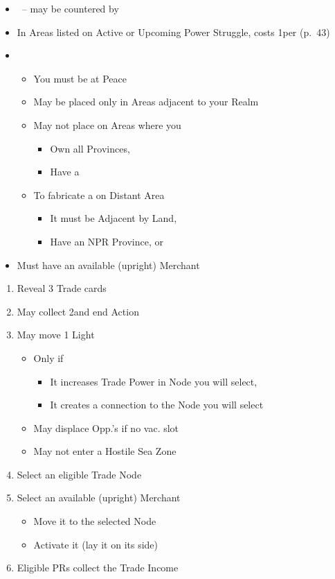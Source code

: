 \documentclass[10pt]{article}
\begin{document}
\begin{itemize}
	\item \covertaction~-- may be countered by 
	\item In Areas listed on Active or Upcoming Power Struggle, costs 1\diplopower per \claim (p.~43)
	\item {}
	\begin{itemize}
		\item You must be at Peace
		\item May be placed only in Areas adjacent to your Realm
		\item May not place \claim on Areas where you
		\begin{itemize}
			\item Own all Provinces,  
			\item Have a \claim
		\end{itemize}
		\item To fabricate a \claim on Distant Area
		\begin{itemize}
			\item It must be Adjacent by Land, 
			\item Have an NPR Province, \vassal or \town
		\end{itemize}
	\end{itemize}
\end{itemize}

\begin{itemize}
	\item Must have an available (upright) Merchant
\end{itemize}
\begin{enumerate}
	\item Reveal 3 Trade cards
	\item May collect 2\ducats and end Action
	\item May move 1 Light \ship
	\begin{itemize}
		\item Only if
		\begin{itemize}
			\item It increases Trade Power in Node you will select, 
			\item It creates a connection to the Node you will select
		\end{itemize}
		\item May displace Opp.'s \ship if no vac. slot
		\item May not enter a Hostile Sea Zone
	\end{itemize}
	\item Select an eligible Trade Node
	\item Select an available (upright) Merchant
	\begin{itemize}
		\item Move it to the selected Node
		\item Activate it (lay it on its side)
	\end{itemize}
	\item Eligible PRs collect the Trade Income
\end{enumerate}
\end{document}
